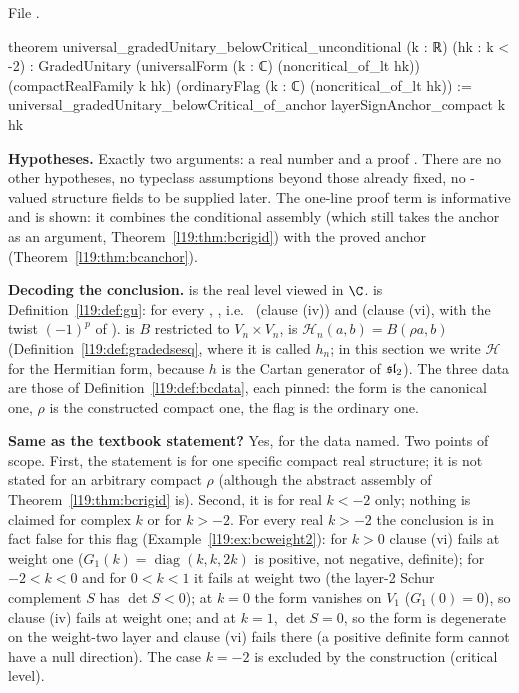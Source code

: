 {\raggedright\noindent File .\par}
\begin{leancode}
theorem universal_gradedUnitary_belowCritical_unconditional (k : ℝ) (hk : k < -2) :
    GradedUnitary (universalForm (k : ℂ) (noncritical_of_lt hk)) (compactRealFamily k hk)
      (ordinaryFlag (k : ℂ) (noncritical_of_lt hk)) :=
  universal_gradedUnitary_belowCritical_of_anchor layerSignAnchor_compact k hk
\end{leancode}

\begin{dictionary}
\textbf{Hypotheses.} Exactly two arguments: a real number  and a proof . There are no
other hypotheses, no typeclass assumptions beyond those already fixed, no -valued structure fields to
be supplied later. The one-line proof term is informative and is shown: it combines the
conditional assembly  (which still takes the anchor as an
argument, Theorem~\ref{l19:thm:bcrigid}) with the proved anchor 
(Theorem~\ref{l19:thm:bcanchor}).

\textbf{Decoding the conclusion.}  is the real level viewed in $\C$.  is
Definition~\ref{l19:def:gu}: for every , , i.e.\  (clause (iv)) and  (clause (vi), with the
twist $(-1)^p$ of ).  is $B$ restricted to $V_n\times V_n$,
 is $\mathcal H_n(a,b) = B(\rho a,b)$ (Definition~\ref{l19:def:gradedsesq}, where it is called $h_n$; in this section we write $\mathcal H$ for the Hermitian form, because $h$ is the Cartan generator of $\mathfrak{sl}_2$). The three data are
those of Definition~\ref{l19:def:bcdata}, each pinned: the form is the canonical one, $\rho$ is the constructed
compact one, the flag is the ordinary one.

\textbf{Same as the textbook statement?} Yes, for the data named. Two points of scope. First, the statement is
for one specific compact real structure; it is not stated for an arbitrary compact $\rho$ (although the abstract
assembly of Theorem~\ref{l19:thm:bcrigid} is). Second, it is for real $k<-2$ only; nothing is claimed for
complex $k$ or for $k>-2$. For every real $k>-2$ the conclusion is in fact false for this flag
(Example~\ref{l19:ex:bcweight2}): for $k>0$ clause (vi) fails at weight one ($G_1(k) = \operatorname{diag}(k,k,2k)$ is
positive, not negative, definite); for $-2<k<0$ and for $0<k<1$ it fails at weight two (the layer-2 Schur complement $S$
has $\det S<0$); at $k = 0$ the form vanishes on $V_1$ ($G_1(0) = 0$), so clause (iv) fails at weight one; and at $k = 1$,
$\det S = 0$, so the form is degenerate on the weight-two layer and clause (vi) fails there (a positive definite form
cannot have a null direction). The case $k = -2$ is excluded by the construction (critical level).


\end{dictionary}
